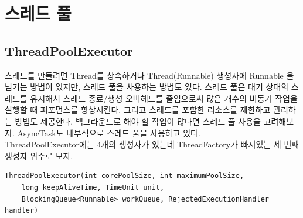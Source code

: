 \section{스레드 풀}
\subsection{ThreadPoolExecutor}
스레드를 만들려면 Thread를 상속하거나 Thread(Runnable) 생성자에 Runnable 을 넘기는 방법이 있지만, 스레드 풀을 사용하는 방법도 있다.
스레드 풀은 대기 상태의 스레드를 유지해서 스레드 종료/생성 오버헤드를 줄임으로써 많은 개수의 비동기 작업을 실행할 때 퍼포먼스를 향상시킨다. 
그리고 스레드를 포함한 리소스를 제한하고 관리하는 방법도 제공한다. 
백그라운드로 해야 할 작업이 많다면 스레드 풀 사용을 고려해보자. AsyncTask도 내부적으로 스레드 풀을 사용하고 있다.\\

ThreadPoolExecutor에는 4개의 생성자가 있는데 ThreadFactory가 빠져있는 세 번째 생성자 위주로 보자.
\begin{lstlisting}[frame=single] 
ThreadPoolExecutor(int corePoolSize, int maximumPoolSize, 
	long keepAliveTime, TimeUnit unit, 	
	BlockingQueue<Runnable> workQueue, RejectedExecutionHandler handler)
\end{lstlisting}

